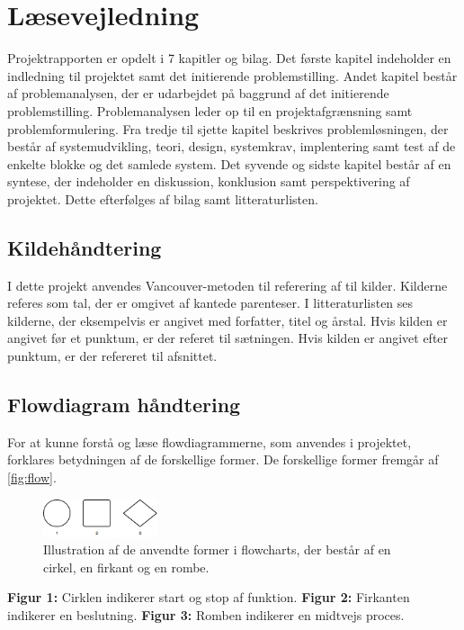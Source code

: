 \section*{Læsevejledning}
Projektrapporten er opdelt i 7 kapitler og bilag. Det første kapitel indeholder en indledning til projektet samt det initierende problemstilling. Andet kapitel består af problemanalysen, der er udarbejdet på baggrund af det initierende problemstilling. Problemanalysen leder op til en projektafgrænsning samt problemformulering. Fra tredje til sjette kapitel beskrives problemløsningen, der består af systemudvikling, teori, design, systemkrav, implentering samt test af de enkelte blokke og det samlede system. Det syvende og sidste kapitel består af en syntese, der indeholder en diskussion, konklusion samt perspektivering af projektet. Dette efterfølges af bilag samt litteraturlisten. 


\subsection{Kildehåndtering}
I dette projekt anvendes Vancouver-metoden til referering af til kilder. Kilderne referes som tal, der er omgivet af kantede parenteser. I litteraturlisten ses kilderne, der eksempelvis er angivet med forfatter, titel og årstal. Hvis kilden er angivet før et punktum, er der referet til sætningen. Hvis kilden er angivet efter punktum, er der refereret til afsnittet. 


\subsection{Flowdiagram håndtering} \label{sec:flowhaandtering}
For at kunne forstå og læse flowdiagrammerne, som anvendes i projektet, forklares betydningen af de forskellige former. De forskellige former fremgår af \autoref{fig:flow}.

\begin{figure}[H]
\centering
\includegraphics[width=0.3\textwidth]{figures/flow}
\caption{Illustration af de anvendte former i flowcharts, der består af en cirkel, en firkant og en rombe.}
\label{fig:flow}
\end{figure}

\noindent
\textbf{Figur 1:} Cirklen indikerer start og stop af funktion.
\textbf{Figur 2:} Firkanten indikerer en beslutning.
\textbf{Figur 3:} Romben indikerer en midtvejs proces.